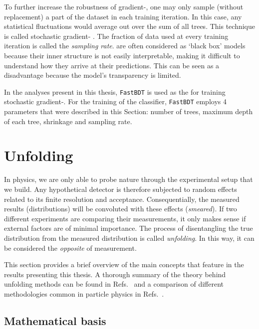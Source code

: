 To further increase the robustness of gradient-, one may only sample (without replacement) a part of the dataset in each training iteration.
In this case, any statistical fluctuations would average out over the sum of all trees. 
This technique is called stochastic gradient- \cite{FRIEDMAN2002367}.
The fraction of data used at every training iteration is called the \textit{sampling rate}.
 are often considered as `black box' models because their inner structure is
not easily interpretable, making it difficult to understand how they arrive at their predictions. 
This can be seen as a disadvantage because the model's transparency is limited.

In the analyses present in this thesis, \texttt{FastBDT} \cite{Keck:2017gsv} is used as the \MVA for training stochastic gradient-.
For the training of the classifier, \texttt{FastBDT} employs 4 parameters that were described in this Section: number of trees, maximum depth of each tree, shrinkage and sampling rate. 

\section{Unfolding}\label{sec:unfolding}

In physics, we are only able to probe nature through the experimental setup that we build.
Any hypothetical detector is therefore subjected to random effects related to its finite resolution and acceptance.
Consequentially, the measured results (distributions) will be convoluted with these effects (\textit{smeared}).
If two different experiments are comparing their measurements, it only makes sense if external factors are of minimal importance.
The process of disentangling the true distribution from the measured distribution is called \textit{unfolding}.
In this way, it can be considered the \textit{opposite} of measurement.

This section provides a brief overview of the main concepts that feature in the results presenting this thesis.
A thorough summary of the theory behind unfolding methods can be found in Refs.~\cite{Behnke:2013pga,Blobel_Lohrmann_1998} and a comparison of different methodologies common in particle physics in Refs.~\cite{Schmitt:2016orm,Cowan:2002in,Brenner:2019lmf}.

\subsection{Mathematical basis}

